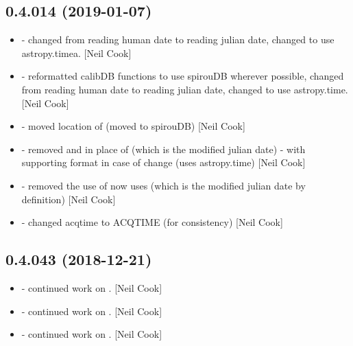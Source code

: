 \documentclass[a4paper,10pt,english]{report}
\begin{document}
\subsection{0.4.014 (2019-01-07)}
\label{\detokenize{misc/changelog:id223}}\begin{itemize}
\item {} 
 - changed from reading human date to reading julian date,
changed to use astropy.timea. {[}Neil Cook{]}

\item {} 
 - reformatted calibDB functions to use spirouDB wherever
possible, changed from reading human date to reading julian date,
changed to use astropy.time. {[}Neil Cook{]}

\item {} 
 - moved location of  (moved to
spirouDB) {[}Neil Cook{]}

\item {} 
 - removed  and  in
place of  (which is the modified julian date) - with
supporting format in case of change (uses astropy.time) {[}Neil Cook{]}

\item {} 
 - removed the use of  now uses
 (which is the modified julian date by definition) {[}Neil
Cook{]}

\item {} 
 - changed acqtime to ACQTIME (for
consistency) {[}Neil Cook{]}

\end{itemize}


\subsection{0.4.043 (2018-12-21)}
\label{\detokenize{misc/changelog:id224}}\begin{itemize}
\item {} 
 - continued work on . {[}Neil Cook{]}

\item {} 
 - continued work on . {[}Neil Cook{]}

\item {} 
 - continued work on . {[}Neil Cook{]}

\end{itemize}
\end{document}
